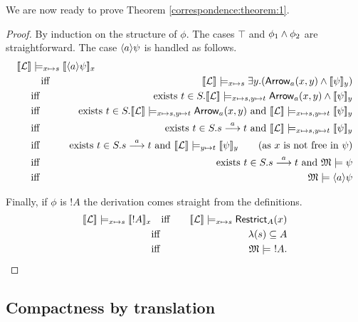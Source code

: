 \NI We are now ready to prove Theorem \ref{correspondence:theorem:1}.
\begin{proof}
By induction on the structure of $\phi$. The cases $\top$ and $\phi_1
\land \phi_2$ are straightforward.  The case $\langle a \rangle \psi$ is handled
as follows.
\begin{eqnarray*}
  \lefteqn{
  \SEMB{\LLL} \models_{x \mapsto s} \SEMB{\MAY{a}\psi}_x}\hspace{5mm} 
     \\
     &\quad \text{iff}\quad &
  \SEMB{\LLL} \models_{x \mapsto s} \exists y.(\ARROW{a}{x}{y} \AND \SEMB{\psi}_y) 
     \\
     &\text{iff}&
  \text{exists}\ t \in S. \SEMB{\LLL} \models_{x \mapsto s, y \mapsto t} \ARROW{a}{x}{y} \AND \SEMB{\psi}_y
     \\
     &\text{iff}&
  \text{exists}\ t \in S. \SEMB{\LLL} \models_{x \mapsto s, y \mapsto t} \ARROW{a}{x}{y} \ \text{and}\ \SEMB{\LLL} \models_{x \mapsto s, y \mapsto t}  \SEMB{\psi}_y
     \\
     &\text{iff}&
  \text{exists}\ t \in S. s \TRANS{a} t \ \text{and}\ \SEMB{\LLL} \models_{x \mapsto s, y \mapsto t}  \SEMB{\psi}_y
     \\
     &\text{iff}&
  \text{exists}\ t \in S. s \TRANS{a} t \ \text{and}\ \SEMB{\LLL} \models_{y \mapsto t}  \SEMB{\psi}_y \qquad (\text{as $x$ is not free in $\psi$})
     \\
     &\text{iff}&
  \text{exists}\ t \in S. s \TRANS{a} t \ \text{and}\ \MMM \models \psi
     \\
     &\text{iff}&
  \MMM \models \MAY{a}\psi  
\end{eqnarray*}

\NI Finally, if $\phi$ is $!A$ the derivation comes straight from the
definitions.
\begin{eqnarray*}
  \lbrack\!\lbrack \mathcal{L} \rbrack\!\rbrack \models_{x \mapsto s} \lbrack\!\lbrack !A \rbrack\!\rbrack_x
    &\quad \text{iff}\quad &
  \lbrack\!\lbrack \mathcal{L} \rbrack\!\rbrack \models_{x \mapsto s} \mathsf{Restrict}_{A}(x)
     \\
     &\text{iff}&
  \lambda(s) \subseteq A
     \\
     &\text{iff}&
  \frak{M} \models\ !A.
\end{eqnarray*}
\end{proof}

\subsection{Compactness by translation}\label{compactnessProof}

